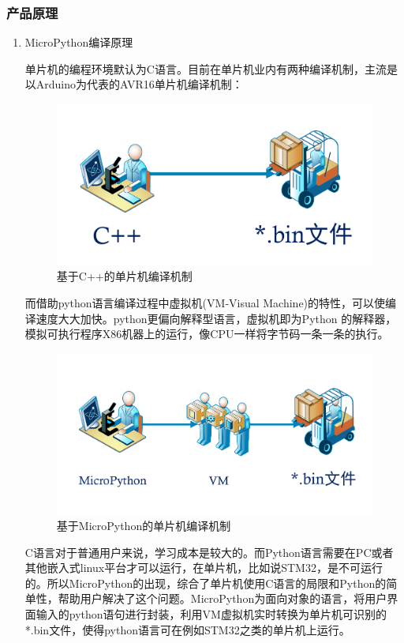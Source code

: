\subsubsection{产品原理}
\begin{enumerate}[(1)]
\item MicroPython编译原理

      单片机的编程环境默认为C语言。目前在单片机业内有两种编译机制，主流是以Arduino为代表的AVR16单片机编译机制：

     \begin{figure}[H]
     \centering
     \includegraphics[width=12cm]{3_Cbin.pdf}
     \caption{基于C++的单片机编译机制}
     \label{基于C++的单片机编译机制}
     \end{figure}

     而借助python语言编译过程中虚拟机(VM-Visual Machine)的特性，可以使编译速度大大加快。python更偏向解释型语言，虚拟机即为Python 的解释器，模拟可执行程序X86机器上的运行，像CPU一样将字节码一条一条的执行。

      \begin{figure}[H]
      \centering
      \includegraphics[width=12cm]{3_Pbin.pdf}
      \caption{基于MicroPython的单片机编译机制}
      \label{基于MicroPython的单片机编译机制}
      \end{figure}

      C语言对于普通用户来说，学习成本是较大的。而Python语言需要在PC或者其他嵌入式linux平台才可以运行，在单片机，比如说STM32，是不可运行的。所以MicroPython的出现，综合了单片机使用C语言的局限和Python的简单性，帮助用户解决了这个问题。MicroPython为面向对象的语言，将用户界面输入的python语句进行封装，利用VM虚拟机实时转换为单片机可识别的*.bin文件，使得python语言可在例如STM32之类的单片机上运行。


\end{enumerate}
